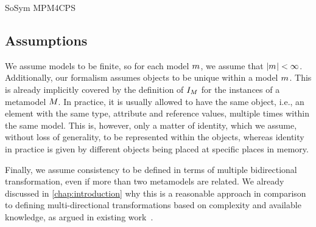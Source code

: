 \begin{copiedFrom}{SoSym MPM4CPS}
\subsection{Assumptions}

We assume models to be finite, so for each model $m_{}$, we assume that $|m_{}| < \infty$.
Additionally, our formalism assumes objects to be unique within a model $m_{}$. 
This is already implicitly covered by the definition of $I_{M}$ for the instances of a metamodel $M_{}$. 
In practice, it is usually allowed to have the same object, i.e., an element with the same type, attribute and reference values, multiple times within the same model. 
This is, however, only a matter of identity, which we assume, without loss of generality, to be represented within the objects, whereas identity in practice is given by different objects being placed at specific places in memory.



Finally, we assume consistency to be defined in terms of multiple bidirectional transformation, even if more than two metamodels are related.
We already discussed in \autoref{chap:introduction} why this is a reasonable approach in comparison to defining multi-directional transformations based on complexity and available knowledge, as argued in existing work~\cite{stevens2017a, klare2018docsym}. %




\end{copiedFrom} %